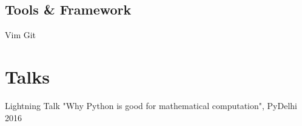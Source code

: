 \documentclass[]{deedy-resume-openfont}
\begin{document}
\begin{minipage}[t]{0.33\textwidth}
\subsection{Tools \& Framework}
\textbullet Vim \textbullet{} Git
\sectionsep


\section{Talks}
\textbullet{} Lightning Talk "Why Python is good for mathematical computation", PyDelhi 2016 \\
\sectionsep

%
%

\end{minipage}
\hfill
\end{document}
